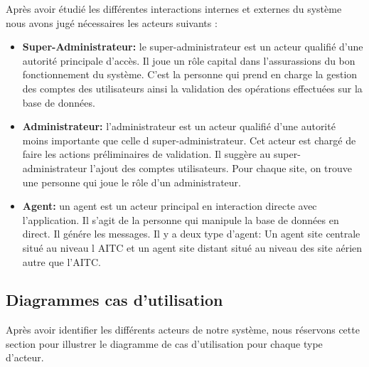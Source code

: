Après avoir étudié les différentes interactions internes et externes du système nous avons jugé nécessaires les acteurs suivants :\\
\begin{itemize}
\item \textbf{Super-Administrateur:} le super-administrateur est un acteur qualifié d’une autorité principale d’accès. Il joue un rôle capital dans l’assurassions du bon fonctionnement du système. C’est la personne qui prend en charge la gestion des comptes des
utilisateurs ainsi la validation des opérations effectuées sur la base de données.\\
\item \textbf{Administrateur:} l'administrateur est un acteur qualifié d'une autorité moins importante que celle d super-administrateur. Cet acteur est chargé de faire les actions préliminaires de validation. Il suggère au super-administrateur l'ajout des comptes utilisateurs. Pour chaque site, on trouve une personne qui joue le rôle d'un administrateur. \\ 
\item \textbf{Agent: } un agent est un acteur principal en interaction directe avec l’application. Il s'agit de la personne qui manipule la base de données en direct. Il génére les messages. Il y a deux type d'agent: Un agent site centrale situé au niveau l AITC et un agent site distant situé au niveau des site aérien autre que l'AITC.\\

\end{itemize}

\subsection{Diagrammes cas d'utilisation}
Après avoir identifier les différents acteurs de notre système, nous réservons cette section pour illustrer le diagramme de cas d'utilisation pour chaque type d'acteur. \\

